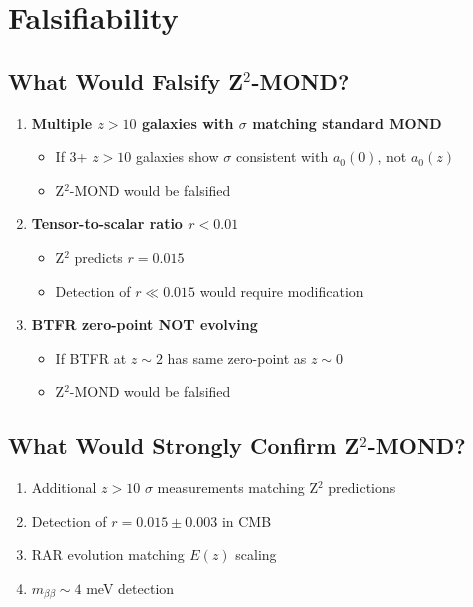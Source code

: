 \documentclass[12pt,a4paper]{article}
\begin{document}
\section{Falsifiability}

\subsection{What Would Falsify Z$^2$-MOND?}

\begin{enumerate}
\item \textbf{Multiple $z > 10$ galaxies with $\sigma$ matching standard MOND}
\begin{itemize}
\item If 3+ $z > 10$ galaxies show $\sigma$ consistent with $a_0(0)$, not $a_0(z)$
\item Z$^2$-MOND would be falsified
\end{itemize}

\item \textbf{Tensor-to-scalar ratio $r < 0.01$}
\begin{itemize}
\item Z$^2$ predicts $r = 0.015$
\item Detection of $r \ll 0.015$ would require modification
\end{itemize}

\item \textbf{BTFR zero-point NOT evolving}
\begin{itemize}
\item If BTFR at $z \sim 2$ has same zero-point as $z \sim 0$
\item Z$^2$-MOND would be falsified
\end{itemize}
\end{enumerate}

\subsection{What Would Strongly Confirm Z$^2$-MOND?}

\begin{enumerate}
\item Additional $z > 10$ $\sigma$ measurements matching Z$^2$ predictions
\item Detection of $r = 0.015 \pm 0.003$ in CMB
\item RAR evolution matching $E(z)$ scaling
\item $m_{\beta\beta} \sim 4$ meV detection
\end{enumerate}
\end{document}
